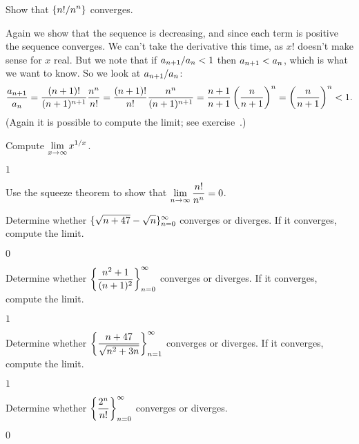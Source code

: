 \begin{example}
Show that $\displaystyle\{n!/n^n\}$ converges.
\par\nobreak\ssk\noindent
Again we show that the sequence is decreasing, and since each term is
positive the sequence converges. We can't take the derivative this
time, as $x!$ doesn't make sense for $x$ real. But we note that if 
$\displaystyle a_{n+1}/a_n < 1$ then $\displaystyle a_{n+1}< a_n$, which is what we want to
know. So we look at $\displaystyle a_{n+1}/a_n$:
$$ 
  {a_{n+1}\over a_n} = {(n+1)!\over (n+1)^{n+1}}{n^n\over n!}=
  {(n+1)!\over n!}{n^n\over (n+1)^{n+1}}=
  {n+1\over n+1}\left({n\over n+1}\right)^n=
  \left({n\over n+1}\right)^n < 1.
$$
(Again it is possible to compute the limit; see
exercise~.)
\end{example}

\begin{exercises}

\begin{exercise} \label{exercise:exponential limit}
Compute $\displaystyle\lim_{x\to\infty} x^{1/x}$.
\begin{answer} $1$
\end{answer}\end{exercise}

\begin{exercise} Use the squeeze theorem to show that 
$\displaystyle\lim_{n\to\infty} {n!\over n^n}=0$.
\label{exercise:factorial limit}
\end{exercise}

\begin{exercise} Determine whether $\displaystyle\{\sqrt{n+47}-\sqrt{n}\}_{n=0}^\infty$ 
converges or diverges. If it converges, compute the limit.
\begin{answer} $0$
\end{answer}\end{exercise}

\begin{exercise} Determine whether 
$\displaystyle\left\{{n^2+1\over (n+1)^2}\right\}_{n=0}^\infty$ 
converges or diverges. If it converges, compute the limit.
\begin{answer} $1$
\end{answer}\end{exercise}

\begin{exercise} Determine whether 
$\displaystyle\left\{{n+47\over\sqrt{n^2+3n}}\right\}_{n=1}^\infty$ 
converges or diverges. If it converges, compute the limit.
\begin{answer} $1$
\end{answer}\end{exercise}

\begin{exercise} Determine whether 
$\displaystyle\left\{{2^n\over n!}\right\}_{n=0}^\infty$ 
converges or diverges. 
\begin{answer} $0$
\end{answer}\end{exercise}

\end{exercises}

